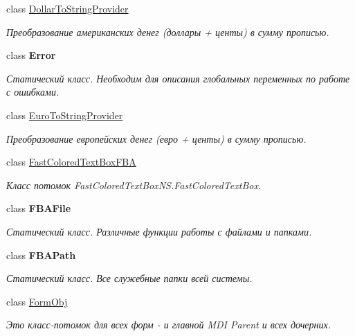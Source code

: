 \begin{DoxyCompactItemize}
class \mbox{\hyperlink{class_f_b_a_1_1_dollar_to_string_provider}{Dollar\+To\+String\+Provider}}
\begin{DoxyCompactList}\small\item\em Преобразование американских денег (доллары + центы) в сумму прописью. \end{DoxyCompactList}\item 
class {\bfseries Error}
\begin{DoxyCompactList}\small\item\em Статический класс. Необходим для описания глобальных переменных по работе с ошибками. ~\newline
\end{DoxyCompactList}\item 
class \mbox{\hyperlink{class_f_b_a_1_1_euro_to_string_provider}{Euro\+To\+String\+Provider}}
\begin{DoxyCompactList}\small\item\em Преобразование европейских денег (евро + центы) в сумму прописью. \end{DoxyCompactList}\item 
class \mbox{\hyperlink{class_f_b_a_1_1_fast_colored_text_box_f_b_a}{Fast\+Colored\+Text\+Box\+F\+BA}}
\begin{DoxyCompactList}\small\item\em Класс потомок Fast\+Colored\+Text\+Box\+N\+S.\+Fast\+Colored\+Text\+Box. \end{DoxyCompactList}\item 
class {\bfseries F\+B\+A\+File}
\begin{DoxyCompactList}\small\item\em Статический класс. Различные функции работы с файлами и папками. \end{DoxyCompactList}\item 
class {\bfseries F\+B\+A\+Path}
\begin{DoxyCompactList}\small\item\em Статический класс. Все служебные папки всей системы. \end{DoxyCompactList}\item 
class \mbox{\hyperlink{class_f_b_a_1_1_form_obj}{Form\+Obj}}
\begin{DoxyCompactList}\small\item\em Это класс-\/потомок для всех форм -\/ и главной M\+DI Parent и всех дочерних. ~\newline
\end{DoxyCompactList}\item 

\end{DoxyCompactItemize}
